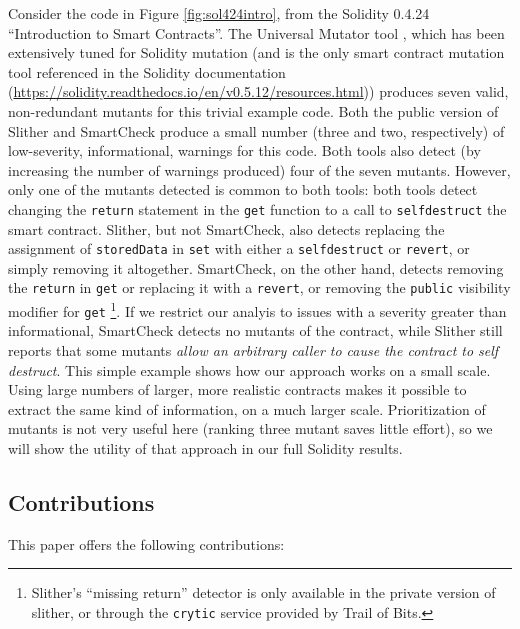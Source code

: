 Consider the code in Figure \ref{fig:sol424intro}, from the Solidity 0.4.24 ``Introduction to Smart Contracts''.  The Universal Mutator tool \cite{universalmutator,regexpMut}, which has been extensively tuned for Solidity mutation (and is the only smart contract mutation tool referenced in the Solidity documentation (\url{https://solidity.readthedocs.io/en/v0.5.12/resources.html})) produces seven valid, non-redundant mutants for this trivial example code.  Both the public version of Slither \cite{slither} and SmartCheck \cite{smartcheck} produce a small number (three and two, respectively) of low-severity, informational, warnings for this code.  Both tools also detect (by increasing the number of warnings produced) four of the seven mutants.  However, only one of the mutants detected is common to both tools: both tools detect changing the {\tt return} statement in the {\tt get} function to a call to {\tt selfdestruct} the smart contract.  Slither, but not SmartCheck, also detects replacing the assignment of {\tt storedData} in {\tt set} with either a {\tt selfdestruct} or {\tt revert}, or simply removing it altogether.  SmartCheck, on the other hand, detects removing the {\tt return} in {\tt get} or replacing it with a {\tt revert}, or removing the {\tt public} visibility modifier for {\tt get} \footnote{Slither's ``missing return'' detector is only available in the private version of slither, or through the {\tt crytic} service provided by Trail of Bits.}.  If we restrict our analyis to issues with a severity greater than informational, SmartCheck detects no mutants of the contract, while Slither still reports that some mutants \emph{allow an arbitrary caller to cause the contract to self destruct}.  This simple example shows how our approach works on a small scale.  Using large numbers of larger, more realistic contracts makes it possible to extract the same kind of information, on a much larger scale.  Prioritization of mutants is not very useful here (ranking three mutant saves little effort), so we will show the utility of that approach in our full Solidity results.

\subsection{Contributions}

This paper offers the following contributions:

